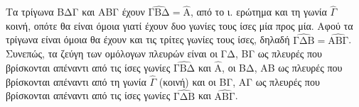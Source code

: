 \begin{alist}
\begin{rlist}
            \item Τα τρίγωνα ΒΔΓ και ΑΒΓ έχουν $\hat{\mathrm{ΓΒΔ}} = \hat{\mathrm{A}}$, από το ι. ερώτημα και τη γωνία $\hat{\Gamma}$ κοινή, οπότε θα είναι όμοια γιατί έχουν δυο γωνίες τους ίσες μία προς μία. Αφού τα τρίγωνα είναι όμοια θα έχουν και τις τρίτες γωνίες τους ίσες, δηλαδή $\hat{\mathrm{ΓΔΒ}} = \hat{\mathrm{ΑΒΓ}}$.
            Συνεπώς, τα ζεύγη των ομόλογων πλευρών είναι οι ΓΔ, ΒΓ ως πλευρές που βρίσκονται απέναντι από τις ίσες γωνίες $\hat{\mathrm{ΓΒΔ}}$ και $\hat{\mathrm{A}}$, οι ΒΔ, ΑΒ ως πλευρές που βρίσκονται απέναντι από τη γωνία $\hat{\Gamma}$ (κοινή) και οι ΒΓ, ΑΓ ως πλευρές που βρίσκονται απέναντι από τις ίσες γωνίες $\hat{\mathrm{ΓΔΒ}}$ και $\hat{\mathrm{ΑΒΓ}}$.
        \end{rlist}

    \item[β)]
        \begin{figure}
            \centering
\end{figure}
\end{alist}
